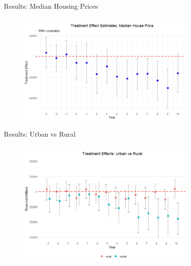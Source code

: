 \documentclass{beamer}
\begin{document}
\begin{frame}{Results: Median Housing Prices}
    \frametitle{}
    \begin{figure}[htbp]
        \centering
        \includegraphics[width=0.8\textwidth]{assets/imgs/tes_gs.png}
        \label{fig:tes_gs}
    \end{figure}
\end{frame}

\begin{frame}{Results: Urban vs Rural}
    \frametitle{}
    \begin{figure}[htbp]
        \centering
        \includegraphics[width=0.8\textwidth]{assets/imgs/tes_covs_ua_new.png}
        \label{fig:tes_covs_ua}
    \end{figure}
\end{frame}
\end{document}
